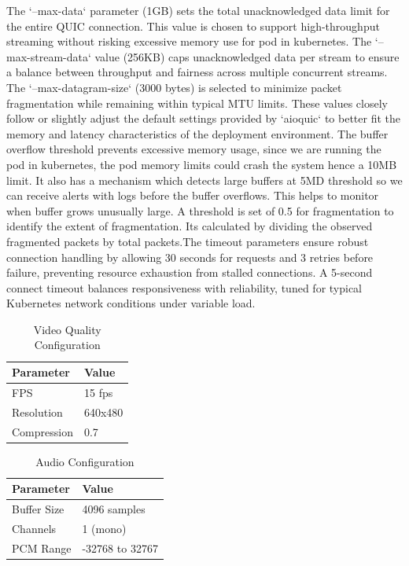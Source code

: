 The `--max-data` parameter (1GB) sets the total unacknowledged data limit for the entire QUIC connection. This value is chosen to support high-throughput streaming without risking excessive memory use for pod in kubernetes. The `--max-stream-data` value (256KB) caps unacknowledged data per stream to ensure a balance between throughput and fairness across multiple concurrent streams. The `--max-datagram-size` (3000 bytes) is selected to minimize packet fragmentation while remaining within typical MTU limits. These values closely follow or slightly adjust the default settings provided by `aioquic` to better fit the memory and latency characteristics of the deployment environment. The buffer overflow threshold prevents excessive memory usage, since we are running the pod in kubernetes, the pod memory limits could crash the system hence a 10MB limit. It also has a mechanism which detects large buffers at 5MD threshold so we can receive alerts with logs before the buffer overflows. This helps to monitor when buffer grows unusually large. A threshold is set of 0.5 for fragmentation to identify the extent of fragmentation. Its calculated by dividing the observed fragmented packets by total packets.The timeout parameters ensure robust connection handling by allowing 30 seconds for requests and 3 retries before failure, preventing resource exhaustion from stalled connections.  
A 5-second connect timeout balances responsiveness with reliability, tuned for typical Kubernetes network conditions under variable load.


\begin{table}[h!]
\centering
\caption{Video Quality Configuration}
\label{tab:video-quality}
\renewcommand{\arraystretch}{1.3}
\begin{tabular}{|l|l|}
\hline
\textbf{Parameter} & \textbf{Value} \\
\hline
FPS & 15 fps \\
\hline
Resolution & 640x480 \\
\hline
Compression & 0.7 \\
\hline
\end{tabular}
\end{table}

\begin{table}[h!]
\centering
\caption{Audio Configuration}
\label{tab:audio-config}
\renewcommand{\arraystretch}{1.3}
\begin{tabular}{|l|l|}
\hline
\textbf{Parameter} & \textbf{Value} \\
\hline
Buffer Size & 4096 samples \\
\hline
Channels & 1 (mono) \\
\hline
PCM Range & -32768 to 32767 \\
\hline
\end{tabular}
\end{table}

